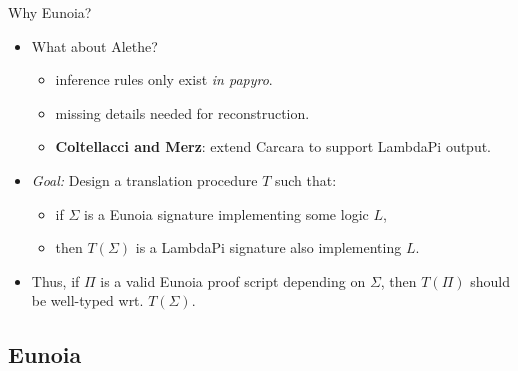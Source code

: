 \documentclass[lualatex, compress, 12pt, handout]{beamer}
\begin{document}
\begin{frame}{Why Eunoia?}
	\begin{itemize}
		\item<+-> What about Alethe?
		      \begin{itemize}
			      \item<+-> inference rules only exist \emph{in papyro}.
			      \item<+-> missing details needed for reconstruction.
			      \item<+->
			            \textbf{Coltellacci and Merz}: extend \alert{Carcara}
			            to support LambdaPi output.
		      \end{itemize}
	\end{itemize}
\end{frame}

\begin{frame}{}
	\begin{itemize}
		\item<+-> \emph{\color{oc-green-9}Goal:}
		      Design a translation procedure $T$ such that:
		      \begin{itemize}
			      \item<+-> if $Σ$ is a Eunoia signature implementing some \alert{logic} $L$,
			      \item<+-> then $T(Σ)$ is a LambdaPi signature also implementing $L$.
			            \\[2mm]
		      \end{itemize}

		\item<+-> Thus, if $Π$ is a valid Eunoia \alert{proof script} depending on $Σ$,
		      then $T(Π)$ should be \alert{well-typed} wrt. $T(Σ)$.
	\end{itemize}
\end{frame}

\subsection{Eunoia}
\end{document}
